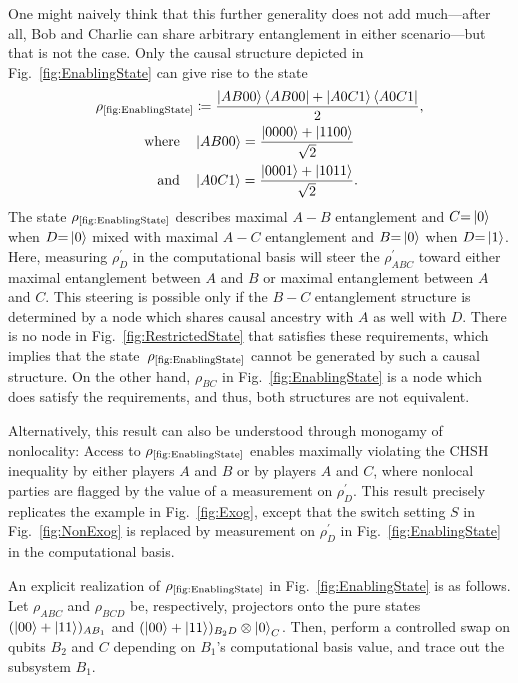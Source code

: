\documentclass[superscriptaddress,aps,prx,nofootinbib,twocolumn,twoside,reprint,letterpaper,longbibliography]{revtex4-2}
\begin{document}
One might naively think that this further generality does not add much---after all, Bob and Charlie can share arbitrary entanglement in either scenario---but that is not the case. Only the causal structure depicted in Fig.~\ref{fig:EnablingState} can give rise to the state
\begin{align}\label{eq:latententangledstate}
  \rho_\text{\ref{fig:EnablingState}}&\coloneqq \frac{\ket{AB00}\bra{AB00}+\ket{A0C1}\bra{A0C1}}{2},\\\nonumber
  \text{where}\quad&\ket{AB00} = \frac{\ket{0000}+\ket{1100}}{\sqrt{2}}\\\nonumber
  \text{and}\quad&\ket{A0C1} = \frac{\ket{0001}+\ket{1011}}{\sqrt{2}}.
\end{align}
The state $\rho_\text{\ref{fig:EnablingState}}$ describes maximal ${A{-}B}$ entanglement and ${C{=}\ket{0}}$ when ${D{=}\ket{0}}$ mixed with maximal ${A{-}C}$ entanglement and  ${B{=}\ket{0}}$ when ${D{=}\ket{1}}$. Here, measuring $\rho^\prime_D$ in the computational basis will steer the  $\rho^\prime_{ABC}$ toward either maximal entanglement between $A$ and $B$ or maximal entanglement between $A$ and $C$.
This steering is possible only if the ${B{-}C}$ entanglement structure is determined by a node which shares causal ancestry with $A$ as well with $D$. There is no node in Fig.~\ref{fig:RestrictedState} that satisfies these requirements, which implies that the state~$\rho_\text{\ref{fig:EnablingState}}$ cannot be generated by such a causal structure.
On the other hand, $\rho_{BC}$ in Fig.~\ref{fig:EnablingState} is a node which does satisfy the requirements, and thus, both structures are not equivalent.

Alternatively, this result can also be understood through monogamy of nonlocality: Access to $\rho_\text{\ref{fig:EnablingState}}$ enables maximally violating the CHSH inequality by either players $A$ and $B$ or by players $A$ and $C$, where nonlocal parties are flagged by the value of a measurement on  $\rho^\prime_D$. This result precisely replicates the example in Fig.~\ref{fig:Exog}, except that the switch setting $S$ in Fig.~\ref{fig:NonExog} is replaced by measurement on $\rho^\prime_D$ in Fig.~\ref{fig:EnablingState} in the computational basis.

An explicit realization of $\rho_\text{\ref{fig:EnablingState}}$ in Fig.~\ref{fig:EnablingState} is as follows. Let $\rho_{ABC}$ and $\rho_{BCD}$ be, respectively, projectors onto the pure states $(\ket{00}+\ket{11})_{AB_1}$ and \mbox{$(\ket{00}+\ket{11})_{B_2D}\otimes\ket{0}_C$}. Then, perform a controlled swap on qubits $B_2$ and $C$ depending on $B_1$'s computational basis value, and trace out the subsystem $B_1$.
\end{document}
